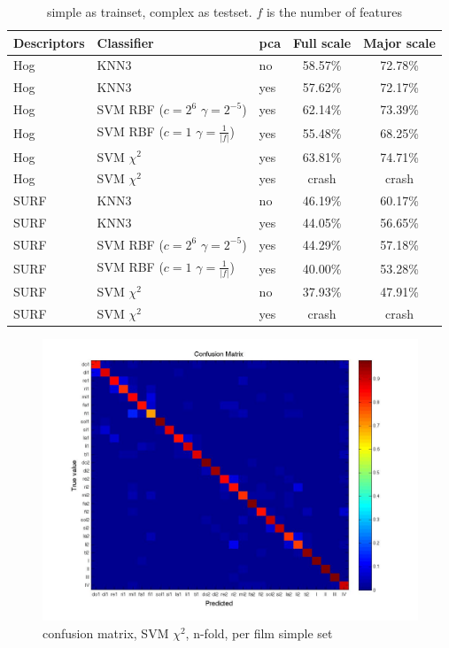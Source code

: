 \begin{table}
\centering
\begin{tabular}{lllcc}
\hline\hline
Descriptors & Classifier 		& pca		&  	Full scale	&	Major scale	\\
\hline
Hog & KNN3				& no	&	58.57\% 	&	72.78\%	\\
Hog & KNN3 				& yes	&	57.62\% 	&	72.17\%	\\
Hog & SVM RBF ($c=2^6$ $\gamma=2^{-5}$)			& yes & 62.14\%	&	73.39\%	\\
Hog & SVM RBF ($c=1$ $\gamma=\frac{1}{|f|}$)	& yes & 55.48\%	&	68.25\%	\\
Hog & SVM $\chi^2$ 		&	yes	&	63.81\%	&	74.71\%	\\
Hog & SVM $\chi^2$		&	yes &	crash 	&	crash \\
\hline
SURF & KNN3				&	no	&	46.19\% 	&	60.17\%	\\
SURF & KNN3										& yes &	44.05\% & 56.65\% \\
SURF & SVM RBF ($c=2^6$ $\gamma=2^{-5}$)		& yes &	44.29\%	&	57.18\%	\\
SURF & SVM RBF ($c=1$ $\gamma=\frac{1}{|f|}$)	& yes &	40.00\%	&	53.28\%	\\
SURF & SVM $\chi^2$								& no  &	37.93\%		&	47.91\%	\\
SURF & SVM $\chi^2$		&	yes	&	crash 	&	crash \\
\hline
\end{tabular}
\caption{simple as trainset, complex as testset. $f$ is the number of features}
\label{tab:perset}
\end{table}




\begin{figure}[htbp]
	\centering{}
	\includegraphics[width=\linewidth]{confmat/confusion.jpg}
	\caption{confusion matrix, SVM $\chi^2$, n-fold, per film simple set}
	\label{fig:confusion}
\end{figure}




